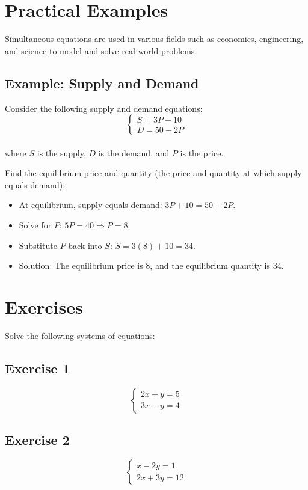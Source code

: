 \documentclass[12pt]{article}
\begin{document}
\newpage

\section*{Practical Examples}
Simultaneous equations are used in various fields such as economics, engineering, and science to model and solve real-world problems.

\subsection*{Example: Supply and Demand}
Consider the following supply and demand equations:
\[
\begin{cases}
S = 3P + 10 \\
D = 50 - 2P
\end{cases}
\]\\
where \( S \) is the supply, \( D \) is the demand, and \( P \) is the price.

Find the equilibrium price and quantity (the price and quantity at which supply equals demand):
\begin{itemize}
    \item At equilibrium, supply equals demand: \( 3P + 10 = 50 - 2P \).
    \item Solve for \( P \): \( 5P = 40 \Rightarrow P = 8 \).
    \item Substitute \( P \) back into \( S \): \( S = 3(8) + 10 = 34 \).
    \item Solution: The equilibrium price is 8, and the equilibrium quantity is 34.
\end{itemize}

\newpage

\section*{Exercises}
Solve the following systems of equations:

\subsection*{Exercise 1}
\[
\begin{cases}
2x + y = 5 \\
3x - y = 4
\end{cases}
\]

\subsection*{Exercise 2}
\[
\begin{cases}
x - 2y = 1 \\
2x + 3y = 12
\end{cases}
\]
\end{document}
